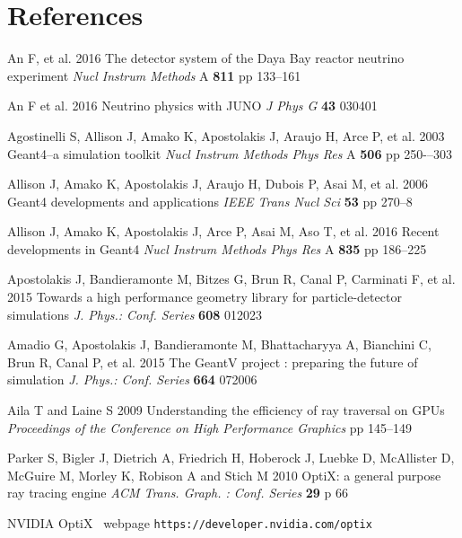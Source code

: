 \documentclass[a4paper]{jpconf}
\begin{document}
\section*{References}
\begin{thebibliography}{9}


An F, et al.
2016
The detector system of the Daya Bay reactor neutrino experiment
{\it Nucl Instrum Methods} A {\bf 811} pp 133--161

An F et al.  
2016
Neutrino physics with JUNO
{\it J Phys G} {\bf 43} 030401


Agostinelli S, Allison J, Amako K, Apostolakis J, Araujo H, Arce P, et al. 
2003  
Geant4--a simulation toolkit 
{\it Nucl Instrum Methods Phys Res} A {\bf 506} pp 250-–303 

Allison J, Amako K, Apostolakis J, Araujo H, Dubois P, Asai M, et al. 
2006 
Geant4 developments and applications 
{\it IEEE Trans Nucl Sci} {\bf 53} pp 270--8

Allison J, Amako K, Apostolakis J, Arce P, Asai M, Aso T, et al. 
2016 
Recent developments in Geant4 
{\it Nucl Instrum Methods Phys Res} A {\bf 835} pp 186--225


Apostolakis J, Bandieramonte M, Bitzes G, Brun R, Canal P, Carminati F, et al. 
2015
Towards a high performance geometry library for particle-detector simulations
{\it J. Phys.: Conf. Series} {\bf 608} 012023

Amadio G, Apostolakis J, Bandieramonte M, Bhattacharyya A, Bianchini C, Brun R, Canal P, et al.
2015
The GeantV project : preparing the future of simulation 
{\it J. Phys.: Conf. Series} {\bf 664} 072006


Aila T and Laine S 
2009
Understanding the efficiency of ray traversal on GPUs
{\it Proceedings of the Conference on High Performance Graphics} pp 145--149


Parker S, Bigler J, Dietrich A, Friedrich H, Hoberock J, Luebke D, McAllister D, McGuire M, Morley K, Robison A and Stich M 
2010 
OptiX: a general purpose ray tracing engine
{\it ACM Trans. Graph. : Conf. Series} {\bf 29} p 66 

NVIDIA{\textregistered} OptiX\texttrademark~ webpage {\tt https://developer.nvidia.com/optix}


\end{thebibliography}
\end{document}
